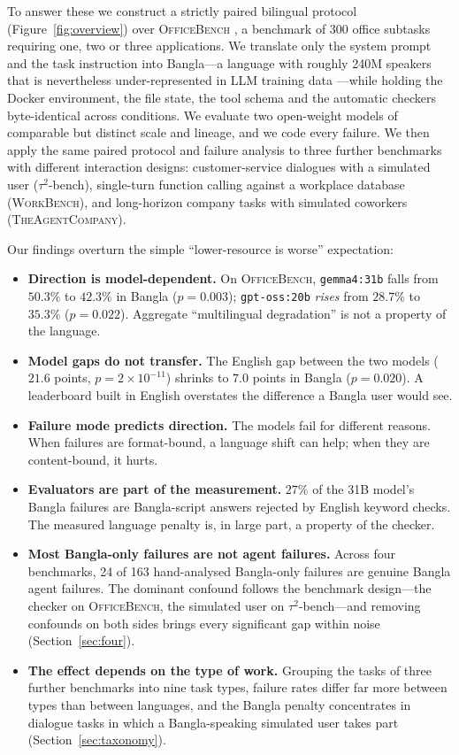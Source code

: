 \documentclass[11pt]{article}
\begin{document}
To answer these we construct a strictly paired bilingual protocol
(Figure~\ref{fig:overview}) over \textsc{OfficeBench}
\citep{wang2024officebench}, a benchmark of 300 office subtasks requiring one, two or three
applications. We translate only the system prompt and the task instruction into Bangla---a
language with roughly 240M speakers that is nevertheless under-represented in LLM training
data \citep{joshi2020state}---while holding the Docker environment, the file state, the tool
schema and the automatic checkers byte-identical across conditions. We evaluate two
open-weight models of comparable but distinct scale and lineage, and we code every failure.
We then apply the same paired protocol and failure analysis to three further benchmarks with
different interaction designs: customer-service dialogues with a simulated user
($\tau^2$-bench), single-turn function calling against a workplace database
(\textsc{WorkBench}), and long-horizon company tasks with simulated coworkers
(\textsc{TheAgentCompany}).

Our findings overturn the simple ``lower-resource is worse'' expectation:

\begin{itemize}[noitemsep,topsep=2pt]
\item \textbf{Direction is model-dependent.} On \textsc{OfficeBench}, \texttt{gemma4:31b} falls
from $50.3\%$ to $42.3\%$ in Bangla ($p{=}0.003$); \texttt{gpt-oss:20b} \emph{rises} from
$28.7\%$ to $35.3\%$ ($p{=}0.022$). Aggregate ``multilingual degradation'' is not a property of
the language.
\item \textbf{Model gaps do not transfer.} The English gap between the two models ($21.6$
points, $p{=}2{\times}10^{-11}$) shrinks to $7.0$ points in Bangla ($p{=}0.020$). A leaderboard
built in English overstates the difference a Bangla user would see.
\item \textbf{Failure mode predicts direction.} The models fail for different reasons. When
failures are format-bound, a language shift can help; when they are content-bound, it hurts.
\item \textbf{Evaluators are part of the measurement.} $27\%$ of the 31B model's Bangla
failures are Bangla-script answers rejected by English keyword checks. The measured language
penalty is, in large part, a property of the checker.
\item \textbf{Most Bangla-only failures are not agent failures.} Across four benchmarks, 24 of
163 hand-analysed Bangla-only failures are genuine Bangla agent failures. The dominant confound
follows the benchmark design---the checker on \textsc{OfficeBench}, the simulated user on
$\tau^2$-bench---and removing confounds on both sides brings every significant gap within
noise (Section~\ref{sec:four}).
\item \textbf{The effect depends on the type of work.} Grouping the tasks of three further
benchmarks into nine task types, failure rates differ far more between types than between
languages, and the Bangla penalty concentrates in dialogue tasks in which a Bangla-speaking
simulated user takes part (Section~\ref{sec:taxonomy}).
\end{itemize}
\end{document}

